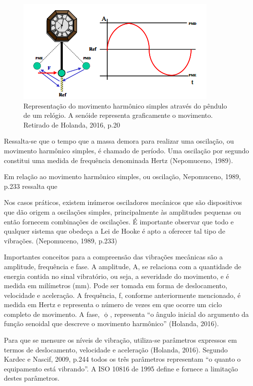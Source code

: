 \documentclass[
	12pt,				
	oneside,			
	a4paper,			
	english,			
	brazil				
	]{abntex2ppgsi}
\begin{document}
\begin{figure}[!htb]
\centering
\includegraphics{Figura16}
\caption {Representação do movimento harmônico simples através do pêndulo de um relógio. A senóide representa graficamente o movimento. Retirado de Holanda, 2016, p.20}
\label{Figura16}
\end{figure}

Ressalta-se que o tempo que a massa demora para realizar uma oscilação, ou movimento harmônico simples, é chamado de período. Uma oscilação por segundo constitui uma medida de frequência denominada Hertz (Nepomuceno, 1989). 

Em relação ao movimento harmônico simples, ou oscilação, Nepomuceno, 1989, p.233 ressalta que

\begin{citacao}
Nos casos práticos, existem inúmeros osciladores mecânicos que são dispositivos que dão origem a oscilações simples, principalmente às amplitudes pequenas ou então fornecem combinações de oscilações. É importante observar que todo e qualquer sistema que obedeça a Lei de Hooke é apto a oferecer tal tipo de vibrações. (Nepomuceno, 1989, p.233)
\end{citacao}

Importantes conceitos para a compreensão das vibrações mecânicas são a amplitude, frequência e fase. A amplitude, A, se relaciona com a quantidade de energia contida no sinal vibratório, ou seja, a severidade do movimento, e é medida em milímetros (mm). Pode ser tomada em forma de deslocamento, velocidade e aceleração.  A frequência, f, conforme anteriormente mencionado, é medida em Hertz e representa o número de vezes em que ocorre um ciclo completo de movimento. A fase, $\upphi$, representa “o ângulo inicial do argumento da função senoidal que descreve o movimento harmônico” (Holanda, 2016).
 
Para que se mensure os níveis de vibração, utiliza-se parâmetros expressos em termos de deslocamento, velocidade e aceleração (Holanda, 2016). Segundo Kardec e Nascif, 2009, p.244 todos os três parâmetros representam “o quanto o equipamento está vibrando”. A ISO 10816 de 1995 define e fornece a limitação destes parâmetros. 
\end{document}
